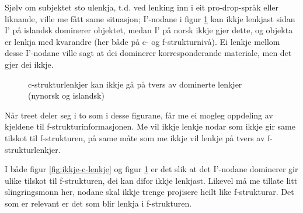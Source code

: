 \documentclass[12pt,a4paper,oneside,draft]{report}
\newcommand{\proj}[2]{\begin{tabular}{c}\footnotesize{#1}\\\normalsize{#2}\end{tabular}}
\newcommand{\ua}{\ensuremath{\uparrow}}
\newcommand{\da}{\ensuremath{\downarrow}}
\begin{document}
Sjølv om subjektet sto ulenkja, t.d. ved lenking inn i eit
pro-drop-språk eller liknande, ville me fått same situasjon; I'-nodane
i figur \ref{fig:ikkje-c-lenkje-pro-drop} kan ikkje lenkjast sidan I'
på islandsk dominerer objektet, medan I' på norsk ikkje gjer dette, og
objekta er lenkja med kvarandre (her både på c- og f\hyp{}strukturnivå). Ei
lenkje mellom desse I'-nodane ville sagt at dei dominerer
korresponderande materiale, men det gjer dei ikkje.

  \begin{figure}[htp]
  \centering
     \caption{c\hyp{}strukturlenkjer kan ikkje gå på tvers av dominerte
     lenkjer (nynorsk og islandsk)}
     \label{fig:ikkje-c-lenkje-pro-drop}
    \end{figure}


Når treet deler seg i to som i desse figurane, får me ei mogleg
oppdeling av kjeldene til f\hyp{}strukturinformasjonen. Me vil ikkje lenkje
nodar som ikkje gir same tilskot til f\hyp{}strukturen, på same måte som me
ikkje vil lenkje på tvers av f\hyp{}strukturlenkjer.

I både figur \ref{fig:ikkje-c-lenkje} og figur
\ref{fig:ikkje-c-lenkje-pro-drop} er det slik at det I'-nodane dominerer gir
ulike tilskot til f\hyp{}strukturen, dei kan difor ikkje lenkjast. Likevel
må me tillate litt slingringsmonn her, nodane skal ikkje trenge
projisere heilt like f\hyp{}strukturar. Det som er relevant er det som blir
lenkja i f\hyp{}strukturen.
\end{document}
